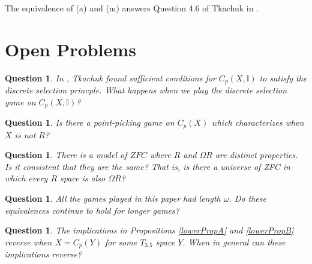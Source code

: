 \documentclass{amsart}
\theoremstyle{plain}
\newtheorem{question}[theorem]{Question}
\theoremstyle{definition}
\theoremstyle{remark}
\theoremstyle{plain}
\theoremstyle{definition}
\theoremstyle{remark}
\begin{document}
The equivalence of (a) and (m) answers Question 4.6 of Tkachuk in \cite{Tkachuk3}.

\section{Open Problems}

\begin{question}
  In \cite{Tkachuk2}, Tkachuk found sufficient conditions for \(C_p(X,\mathbb{I})\) 
  to satisfy the discrete selection princple. 
  What happens when we play the discrete selection game on \(C_p(X,\mathbb I)\)?
\end{question}

\begin{question}
 Is there a point-picking game on \(C_p(X)\) which characterizes when \(X\) is not \(R\)?
\end{question}

\begin{question}
 There is a model of \(ZFC\) where \(R\) and \(\Omega R\) are distinct properties.
 Is it consistent that they are the same?
 That is, is there a universe of ZFC in which every \(R\) space is also \(\Omega R\)?
\end{question}

\begin{question}
 All the games played in this paper had length \(\omega\).
 Do these equivalences continue to hold for longer games?
\end{question}

\begin{question}
 The implications in Propositions \ref{lowerPropA} and \ref{lowerPropB} reverse
 when \(X=C_p(Y)\) for some \(T_{3.5}\) space \(Y\). When in general can these
 implications reverse?
\end{question}




\end{document}
